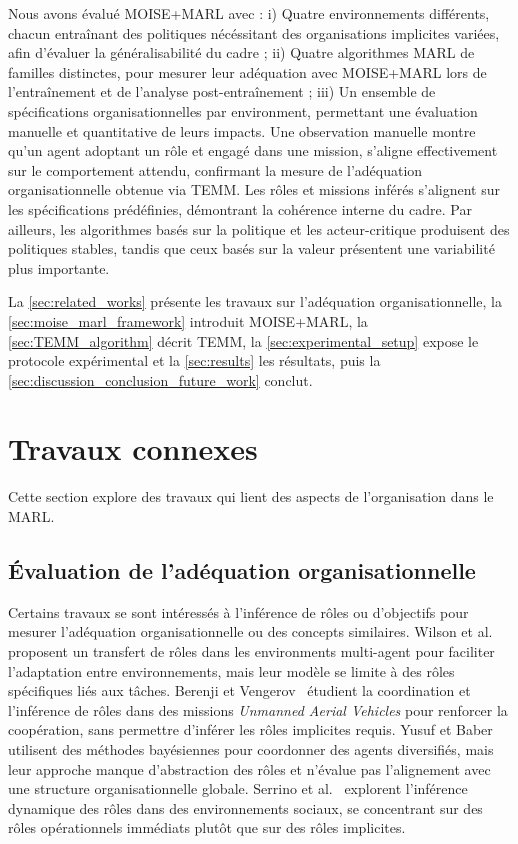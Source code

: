 \documentclass[final]{jfsma}
\begin{document}
Nous avons évalué MOISE+MARL avec :
i) Quatre environnements différents, chacun entraînant des politiques nécéssitant des organisations implicites variées, afin d'évaluer la généralisabilité du cadre
; \quad
ii) Quatre algorithmes MARL de familles distinctes, pour mesurer leur adéquation avec MOISE+MARL lors de l'entraînement et de l'analyse post-entraînement
; \quad
iii) Un ensemble de spécifications organisationnelles par environment, permettant une évaluation manuelle et quantitative de leurs impacts.
%
Une observation manuelle montre qu'un agent adoptant un rôle et engagé dans une mission, s'aligne effectivement sur le comportement attendu, confirmant la mesure de l'adéquation organisationnelle obtenue via TEMM. Les rôles et missions inférés s'alignent sur les spécifications prédéfinies, démontrant la cohérence interne du cadre. Par ailleurs, les algorithmes basés sur la politique et les acteur-critique produisent des politiques stables, tandis que ceux basés sur la valeur présentent une variabilité plus importante.


\noindent La \autoref{sec:related_works} présente les travaux sur l'adéquation organisationnelle, la \autoref{sec:moise_marl_framework} introduit MOISE+MARL, la \autoref{sec:TEMM_algorithm} décrit TEMM, la \autoref{sec:experimental_setup} expose le protocole expérimental et la \autoref{sec:results} les résultats, puis la \autoref{sec:discussion_conclusion_future_work} conclut.

\section{Travaux connexes}
\label{sec:related_works}

Cette section explore des travaux qui lient des aspects de l'organisation dans le MARL.

\subsection{Évaluation de l'adéquation organisationnelle}

Certains travaux se sont intéressés à l'inférence de rôles ou d'objectifs pour mesurer l'adéquation organisationnelle ou des concepts similaires.
%
Wilson et al.~\cite{wilson2008learning} proposent un transfert de rôles dans les environments multi-agent pour faciliter l'adaptation entre environnements, mais leur modèle se limite à des rôles spécifiques liés aux tâches.
%
Berenji et Vengerov~\cite{berenji2000learning} étudient la coordination et l'inférence de rôles dans des missions \textit{Unmanned Aerial Vehicles} pour renforcer la coopération, sans permettre d'inférer les rôles implicites requis.
%
Yusuf et Baber~\cite{yusuf2020inferential} utilisent des méthodes bayésiennes pour coordonner des agents diversifiés, mais leur approche manque d'abstraction des rôles et n'évalue pas l'alignement avec une structure organisationnelle globale.
%
Serrino et al.~\cite{serrino2019finding} explorent l'inférence dynamique des rôles dans des environnements sociaux, se concentrant sur des rôles opérationnels immédiats plutôt que sur des rôles implicites.
\end{document}
